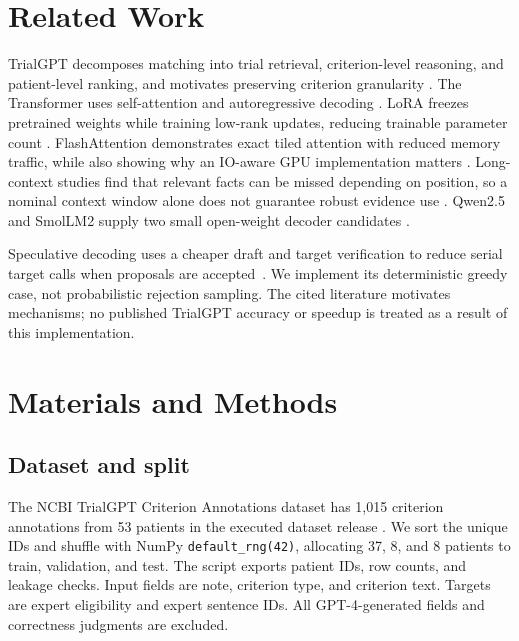 \documentclass[conference]{IEEEtran}
\begin{document}
\section{Related Work}

TrialGPT decomposes matching into trial retrieval, criterion-level reasoning, and patient-level ranking, and motivates preserving criterion granularity \cite{jin2024trialgpt}. The Transformer uses self-attention and autoregressive decoding \cite{vaswani2017attention}. LoRA freezes pretrained weights while training low-rank updates, reducing trainable parameter count \cite{hu2021lora}. FlashAttention demonstrates exact tiled attention with reduced memory traffic, while also showing why an IO-aware GPU implementation matters \cite{dao2022flashattention}. Long-context studies find that relevant facts can be missed depending on position, so a nominal context window alone does not guarantee robust evidence use \cite{liu2024lost}. Qwen2.5 and SmolLM2 supply two small open-weight decoder candidates \cite{qwenmodel,allal2025smollm}.

Speculative decoding uses a cheaper draft and target verification to reduce serial target calls when proposals are accepted~\cite{leviathan2023speculative,chen2023speculative}. We implement its deterministic greedy case, not probabilistic rejection sampling. The cited literature motivates mechanisms; no published TrialGPT accuracy or speedup is treated as a result of this implementation.
\section{Materials and Methods}

\subsection{Dataset and split}
The NCBI TrialGPT Criterion Annotations dataset has 1,015 criterion annotations from 53 patients in the executed dataset release \cite{trialgptdataset}. We sort the unique IDs and shuffle with NumPy \texttt{default\_rng(42)}, allocating 37, 8, and 8 patients to train, validation, and test. The script exports patient IDs, row counts, and leakage checks. Input fields are note, criterion type, and criterion text. Targets are expert eligibility and expert sentence IDs. All GPT-4-generated fields and correctness judgments are excluded.
\end{document}
